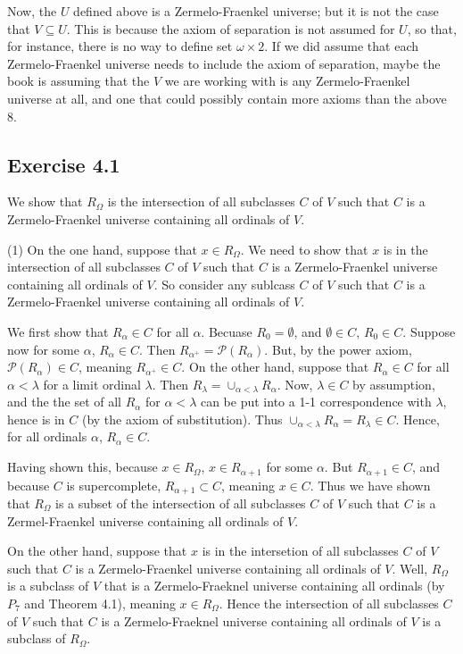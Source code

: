 \documentclass{article}
\theoremstyle{definition}
\begin{document}
Now, the $U$ defined above is a Zermelo-Fraenkel universe; but it is not the case that $V\subseteq U$. This is because the axiom 
of separation is not assumed for $U$, so that, for instance, there is no way to define set $\omega\times 2$.
If we did assume that each Zermelo-Fraenkel universe needs to include the axiom of separation, maybe 
the book is assuming that the $V$ we are working with is any Zermelo-Fraenkel universe at all, and one that could possibly contain 
more axioms than the above 8.

\subsection*{Exercise 4.1}
We show that $R_\Omega$ is the intersection of all subclasses $C$ of $V$ such that $C$ is a Zermelo-Fraenkel universe containing all ordinals of $V$.

(1) On the one hand, suppose that $x\in R_\Omega$. We need to show that $x$ is in the intersection of all subclasses $C$ of $V$ such that $C$ is a 
Zermelo-Fraenkel universe containing all ordinals of $V$. So consider any sublcass $C$ of $V$ such that $C$ is a 
Zermelo-Fraenkel universe containing all ordinals of $V$.

We first show that $R_\alpha\in C$ for all $\alpha$. Becuase $R_0=\emptyset$, and $\emptyset\in C$, $R_0\in C$. 
Suppose now for some $\alpha$, $R_\alpha\in C$. Then $R_{\alpha^+}=\mathcal{P}(R_\alpha)$. But, by the power axiom, 
$\mathcal{P}(R_\alpha)\in C$, meaning $R_{\alpha^+}\in C$. On the other hand, suppose that $R_\alpha\in C$ for all 
$\alpha<\lambda$ for a limit ordinal $\lambda$. Then $R_\lambda=\cup_{\alpha<\lambda}R_\alpha$. Now, $\lambda\in C$ by assumption, 
and the the set of all $R_\alpha$ for $\alpha<\lambda$ can be put into a 1-1 correspondence with $\lambda$, hence is in $C$ (by the axiom of 
substitution). Thus $\cup_{\alpha<\lambda}R_\alpha=R_\lambda\in C$. Hence, for all ordinals $\alpha$, $R_\alpha\in C$.

Having shown this, because $x\in R_\Omega$, $x\in R_{\alpha+1}$ for some $\alpha$. But $R_{\alpha+1}\in C$, and because 
$C$ is supercomplete, $R_{\alpha+1}\subset C$, meaning $x\in C$. Thus we have shown that $R_\Omega$ is a subset 
of the intersection of all subclasses $C$ of $V$ such that $C$ is a Zermel-Fraenkel universe containing all ordinals of $V$.

On the other hand, suppose that $x$ is in the intersetion of all subclasses $C$ of $V$ such that $C$ is a Zermelo-Fraenkel universe containing all ordinals of $V$. Well, 
$R_\Omega$ is a subclass of $V$ that is a Zermelo-Fraeknel universe containing all ordinals (by $P_7$ and Theorem 4.1), meaning $x\in R_\Omega$. Hence 
the intersection of all subclasses $C$ of $V$ such that $C$ is a Zermelo-Fraeknel universe containing all ordinals of $V$ is a subclass of $R_\Omega$. 
\end{document}
